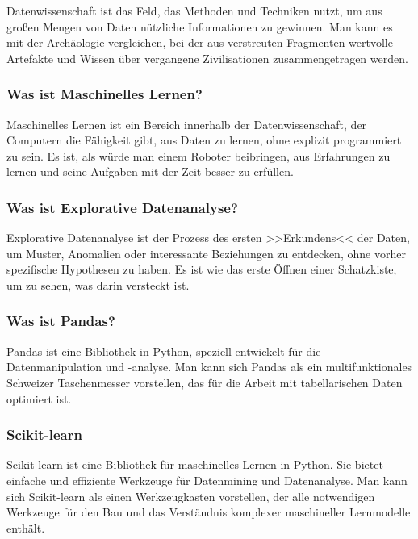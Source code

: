 \documentclass{vorlage-design-main}
\begin{document}
Datenwissenschaft ist das Feld, das Methoden und Techniken nutzt, um aus
großen Mengen von Daten nützliche Informationen zu gewinnen. Man kann es
mit der Archäologie vergleichen, bei der aus verstreuten Fragmenten
wertvolle Artefakte und Wissen über vergangene Zivilisationen
zusammengetragen werden.

\subsubsection{Was ist Maschinelles
Lernen?}\label{was-ist-maschinelles-lernen}

Maschinelles Lernen ist ein Bereich innerhalb der Datenwissenschaft, der
Computern die Fähigkeit gibt, aus Daten zu lernen, ohne explizit
programmiert zu sein. Es ist, als würde man einem Roboter beibringen,
aus Erfahrungen zu lernen und seine Aufgaben mit der Zeit besser zu
erfüllen.

\subsubsection{Was ist Explorative
Datenanalyse?}\label{was-ist-explorative-datenanalyse}

Explorative Datenanalyse ist der Prozess des ersten >>Erkundens<< der
Daten, um Muster, Anomalien oder interessante Beziehungen zu entdecken,
ohne vorher spezifische Hypothesen zu haben. Es ist wie das erste Öffnen
einer Schatzkiste, um zu sehen, was darin versteckt ist.

\subsubsection{Was ist Pandas?}\label{was-ist-pandas}

Pandas ist eine Bibliothek in Python, speziell entwickelt für die
Datenmanipulation und -analyse. Man kann sich Pandas als ein
multifunktionales Schweizer Taschenmesser vorstellen, das für die Arbeit
mit tabellarischen Daten optimiert ist.

\subsubsection{Scikit-learn}\label{scikit-learn}

Scikit-learn ist eine Bibliothek für maschinelles Lernen in Python. Sie
bietet einfache und effiziente Werkzeuge für Datenmining und
Datenanalyse. Man kann sich Scikit-learn als einen Werkzeugkasten
vorstellen, der alle notwendigen Werkzeuge für den Bau und das
Verständnis komplexer maschineller Lernmodelle enthält.
\end{document}
